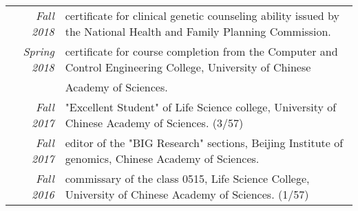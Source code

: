%
%



\begin{tabular}{rl}	
	\emph{Fall 2018} & certificate for clinical genetic counseling ability issued by the National Health and Family Planning Commission.\\
	\emph{Spring 2018} & certificate for course completion from the Computer and Control Engineering College, University of Chinese \\
	\emph{} &	Academy of Sciences. \\
	\emph{Fall 2017} & "Excellent Student" of Life Science college, University of Chinese Academy of Sciences. (3/57) \\
	\emph{Fall 2017} & editor of the "BIG Research" sections, Beijing Institute of genomics, Chinese Academy of Sciences. \\
	\emph{Fall 2016} & commissary of the class 0515, Life Science College, University of Chinese Academy of Sciences. (1/57)	
\end{tabular}